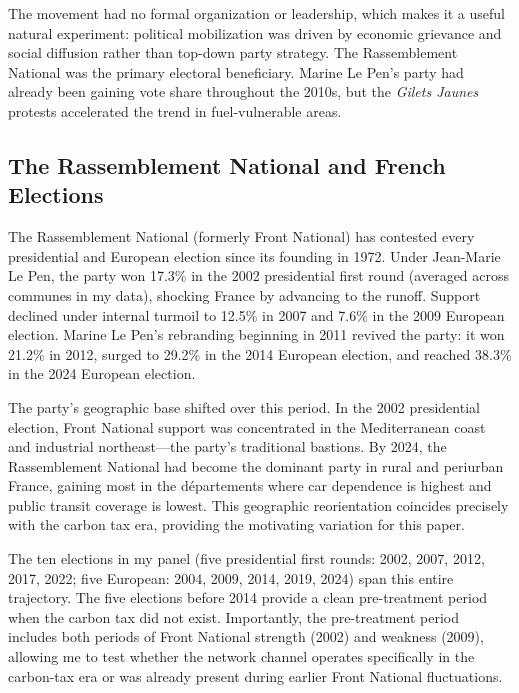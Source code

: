 \documentclass[12pt]{article}
\newcommand{\rn}{Rassemblement National}
\newcommand{\fn}{Front National}
\newcommand{\gj}{\textit{Gilets Jaunes}}
\newcommand{\depts}{d\'{e}partements}
\begin{document}
The movement had no formal organization or leadership, which makes it a useful natural experiment: political mobilization was driven by economic grievance and social diffusion rather than top-down party strategy. The \rn{} was the primary electoral beneficiary. Marine Le Pen's party had already been gaining vote share throughout the 2010s, but the \gj{} protests accelerated the trend in fuel-vulnerable areas.

\subsection{The \rn{} and French Elections}

The \rn{} (formerly \fn{}) has contested every presidential and European election since its founding in 1972. Under Jean-Marie Le Pen, the party won 17.3\% in the 2002 presidential first round (averaged across communes in my data), shocking France by advancing to the runoff. Support declined under internal turmoil to 12.5\% in 2007 and 7.6\% in the 2009 European election. Marine Le Pen's rebranding beginning in 2011 revived the party: it won 21.2\% in 2012, surged to 29.2\% in the 2014 European election, and reached 38.3\% in the 2024 European election.

The party's geographic base shifted over this period. In the 2002 presidential election, \fn{} support was concentrated in the Mediterranean coast and industrial northeast---the party's traditional bastions. By 2024, the \rn{} had become the dominant party in rural and periurban France, gaining most in the \depts{} where car dependence is highest and public transit coverage is lowest. This geographic reorientation coincides precisely with the carbon tax era, providing the motivating variation for this paper.

The ten elections in my panel (five presidential first rounds: 2002, 2007, 2012, 2017, 2022; five European: 2004, 2009, 2014, 2019, 2024) span this entire trajectory. The five elections before 2014 provide a clean pre-treatment period when the carbon tax did not exist. Importantly, the pre-treatment period includes both periods of \fn{} strength (2002) and weakness (2009), allowing me to test whether the network channel operates specifically in the carbon-tax era or was already present during earlier \fn{} fluctuations.


\end{document}
